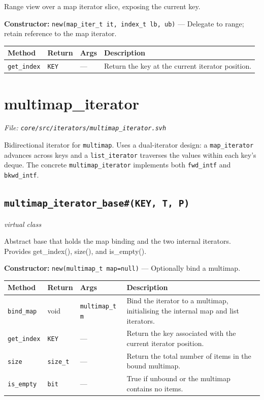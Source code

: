 \documentclass[11pt,letterpaper]{report}
\begin{document}
Range view over a map iterator slice, exposing the current key.

\noindent\textbf{Constructor:} \texttt{new(map\_iter\_t it, index\_t lb, ub)} --- Delegate to range; retain reference to the map iterator.

\begin{xltabular}{\linewidth}{>{\small}p{1.35in} >{\small}p{1.25in} >{\small}p{0.95in} >{\small}X}
\toprule
\textbf{Method} & \textbf{Return} & \textbf{Args} & \textbf{Description} \\
\midrule
\endhead
\bottomrule
\endfoot
\texttt{get\_index} & \texttt{KEY} & --- & Return the key at the current iterator position. \\
\end{xltabular}

\section{multimap\_iterator}
\noindent\small\textit{File: \texttt{core/src/iterators/multimap\_iterator.svh}}\par

Bidirectional iterator for \texttt{multimap}. Uses a dual-iterator design: a \texttt{map\_iterator} advances across keys and a \texttt{list\_iterator} traverses the values within each key's deque. The concrete \texttt{multimap\_iterator} implements both \texttt{fwd\_intf} and \texttt{bkwd\_intf}.

\subsection*{\texttt{multimap\_iterator\_base\#(KEY, T, P)}}
\noindent\small\textit{virtual class}\par

Abstract base that holds the map binding and the two internal iterators. Provides get\_index(), size(), and is\_empty().

\noindent\textbf{Constructor:} \texttt{new(multimap\_t map=null)} --- Optionally bind a multimap.

\begin{xltabular}{\linewidth}{>{\small}p{1.35in} >{\small}p{1.25in} >{\small}p{0.95in} >{\small}X}
\toprule
\textbf{Method} & \textbf{Return} & \textbf{Args} & \textbf{Description} \\
\midrule
\endhead
\bottomrule
\endfoot
\texttt{bind\_map} & void & \texttt{multimap\_t m} & Bind the iterator to a multimap, initialising the internal map and list iterators. \\
\texttt{get\_index} & \texttt{KEY} & --- & Return the key associated with the current iterator position. \\
\texttt{size} & \texttt{size\_t} & --- & Return the total number of items in the bound multimap. \\
\texttt{is\_empty} & \texttt{bit} & --- & True if unbound or the multimap contains no items. \\
\end{xltabular}
\end{document}
